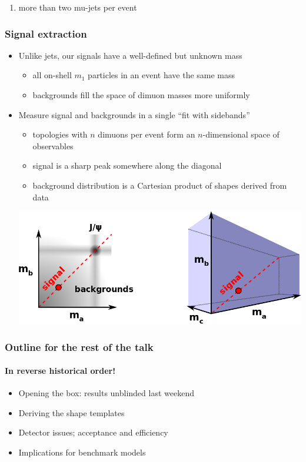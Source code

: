\documentclass[compress]{beamer}
\begin{document}
\begin{frame}
\begin{center}
\begin{minipage}{0.8\linewidth}
\begin{enumerate}
\item \scriptsize more than two mu-jets per event
\end{enumerate}
\end{minipage}
\end{center}
\end{frame}

\begin{frame}
\frametitle{Signal extraction}

\begin{itemize}
\item Unlike jets, our signals have a well-defined but unknown mass
\begin{itemize}
\item all on-shell $m_1$ particles in an event have the same mass
\item backgrounds fill the space of dimuon masses more uniformly
\end{itemize}
\item Measure signal and backgrounds in a single ``fit with sidebands''
\begin{itemize}
\item topologies with $n$ dimuons per event form an $n$-dimensional
  space of observables
\item signal is a sharp peak somewhere along the diagonal
\item background distribution is a Cartesian product of shapes derived from data
\end{itemize}

\begin{center}
\includegraphics[width=0.9\linewidth]{diagonal.png}
\end{center}
\end{itemize}
\end{frame}

\begin{frame}
\frametitle{Outline for the rest of the talk}
\framesubtitle{In reverse historical order!}

\begin{itemize}\setlength{\itemsep}{0.5 cm}
\item Opening the box: results unblinded last weekend
\item Deriving the shape templates
\item Detector issues; acceptance and efficiency
\item Implications for benchmark models
\end{itemize}
\end{frame}
\end{document}
